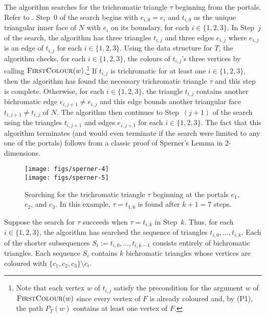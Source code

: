 \documentclass[kpfonts]{patmorin}
\begin{document}
 The algorithm searches for the trichromatic triangle $\tau$ beginning from the portals.  Refer to . Step~0 of the search begins with $e_{i,0}=e_i$ and $t_{i,0}$ as the unique triangular inner face of $N$ with $e_i$ on its boundary, for each $i\in\{1,2,3\}$. In Step~$j$ of the search, the algorithm has three triangles $t_{i,j}$ and three edges $e_{i,j}$ where $e_{i,j}$ is an edge of $t_{i,j}$ for each $i\in\{1,2,3\}$.  Using the data structure for $T$, the algorithm checks, for each $i\in\{1,2,3\}$, the colours of $t_{i,j}$'s three vertices by calling $\textsc{FirstColour}(w)$.\footnote{Note that each vertex $w$ of $t_{i,j}$ satisfy the precondition for the argument $w$ of $\textsc{FirstColour}(w)$ since every vertex of $F$ is already coloured and, by (P1), the path $P_{T}(w)$ contains at least one vertex of $F$.}  If $t_{i,j}$ is trichromatic for at least one $i\in\{1,2,3\}$, then the algorithm has found the necessary trichromatic triangle $\tau$ and this step is complete. Otherwise, for each $i\in\{1,2,3\}$, the triangle $t_{i,j}$ contains another bichromatic edge $e_{i,j+1}\neq e_{i,j}$ and this edge bounds another triangular face $t_{i,j+1}\neq t_{i,j}$ of $N$.  The algorithm then continues to Step~$(j+1)$ of the search using the triangles $t_{i,j+1}$ and edges $e_{i,j+1}$ for each $i\in\{1,2,3\}$.  The fact that this algorithm terminates (and would even terminate if the search were limited to any one of the portals) follows from a classic proof of Sperner's Lemma in 2-dimensions.

 \begin{figure}
   \begin{center}
     \texttt{[image: figs/sperner-4]} \\[1ex]
     \texttt{[image: figs/sperner-5]}
   \end{center}
   \caption{Searching for the trichromatic triangle $\tau$ beginning at the portals $e_1$, $e_2$, and $e_3$. In this example, $\tau=t_{1,6}$ is found after $k+1=7$ steps.}
 \end{figure}


Suppose the search for $\tau$ succeeds when $\tau=t_{i,k}$ in Step~$k$.  Thus, for each $i\in\{1,2,3\}$, the algorithm has searched the sequence of triangles $t_{i,0},\ldots,t_{i,k}$.  Each of the shorter subsequences $S_i:=t_{i,0},\ldots,t_{i,k-1}$ consists entirely of bichromatic triangles. Each sequence $S_i$ contains $k$ bichromatic triangles whose vertices are coloured with $\{c_1,c_2,c_3\}\setminus c_i$.
\end{document}

